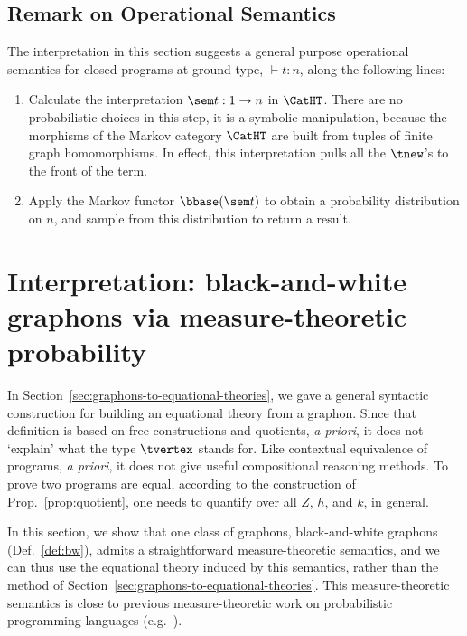 \subsection{Remark on Operational Semantics}
\label{sec:abstract-op-sem}
The interpretation in this section suggests a general purpose operational semantics for closed programs at ground type,
$\vdash t:n$, along the following lines:
\begin{enumerate}
\item Calculate the interpretation $\sem t:1\to n$ in $\CatHT$. There are no probabilistic choices in this step, it is a symbolic manipulation, because the morphisms of the Markov category
  $\CatHT$ are built from tuples of finite graph homomorphisms. In effect, this interpretation pulls all the $\tnew$'s to the front of the term.
\item Apply the Markov functor $\bbase(\sem t)$ to obtain a probability distribution on $n$, and sample from this distribution to return a result.
\end{enumerate}



\section{Interpretation: black-and-white graphons via measure-theoretic probability}
\label{sec:randomfree}
In Section~\ref{sec:graphons-to-equational-theories}, we gave a general
syntactic construction for building an equational theory from a
graphon. Since that definition is based on free constructions and quotients, \emph{a priori}, it does not `explain' what the type $\tvertex$ stands for. Like contextual equivalence of programs, \emph{a priori}, it does not give useful compositional reasoning methods. To prove two programs are equal, according to the construction of Prop.~\ref{prop:quotient}, one needs to quantify over all $Z$, $h$, and $k$, in general.

In this section, we show that one class of graphons, black-and-white
graphons (Def.~\ref{def:bw}), admits a straightforward measure-theoretic semantics, and we can thus 
use the equational theory induced by this semantics, rather than the 
method of Section~\ref{sec:graphons-to-equational-theories}. This measure-theoretic semantics is close to 
previous measure-theoretic work on probabilistic programming
languages (e.g.~\cite{Kozen81,s-finite}). 

